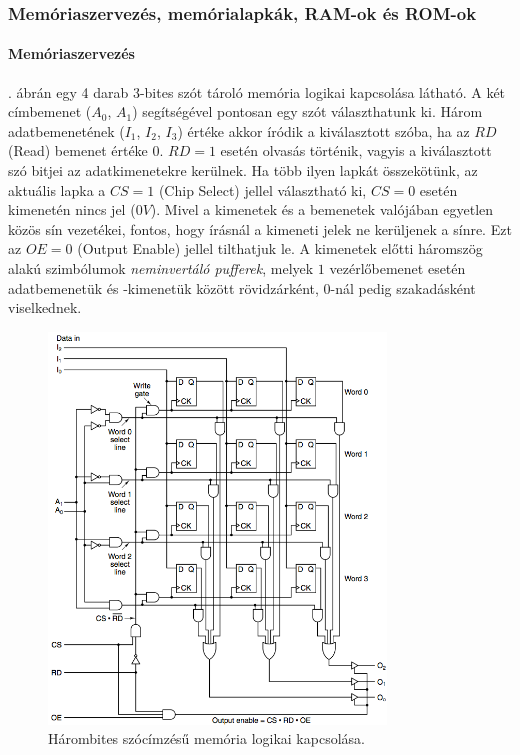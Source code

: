 \documentclass[10pt]{article}
\begin{document}
\subsubsection{Memóriaszervezés, memórialapkák, RAM-ok és ROM-ok}

\paragraph{Memóriaszervezés}

. ábrán egy 4 darab 3-bites szót tároló memória logikai kapcsolása látható. A két címbemenet ($A_0$, $A_1$) segítségével pontosan egy szót választhatunk ki. Három adatbemenetének ($I_1$, $I_2$, $I_3$) értéke akkor íródik a kiválasztott szóba, ha az $RD$ (Read) bemenet értéke $0$. $RD=1$ esetén olvasás történik, vagyis a kiválasztott szó bitjei az adatkimenetekre kerülnek. Ha több ilyen lapkát összekötünk, az aktuális lapka a $CS=1$ (Chip Select) jellel választható ki, $CS=0$ esetén kimenetén nincs jel ($0V$). Mivel a kimenetek és a bemenetek valójában egyetlen közös sín vezetékei, fontos, hogy írásnál a kimeneti jelek ne kerüljenek a sínre. Ezt az $OE=0$ (Output Enable) jellel tilthatjuk le. A kimenetek előtti háromszög alakú szimbólumok \emph{neminvertáló pufferek}, melyek $1$ vezérlőbemenet esetén adatbemenetük és -kimenetük között rövidzárként, $0$-nál pedig szakadásként viselkednek.

\begin{figure}[htbp]
	\centering
		\includegraphics[width=0.8\textwidth]{img/memoriaszervezes}
	\caption{Hárombites szócímzésű memória logikai kapcsolása.\label{fig:memoriaszervezes}}
\end{figure}
\end{document}
